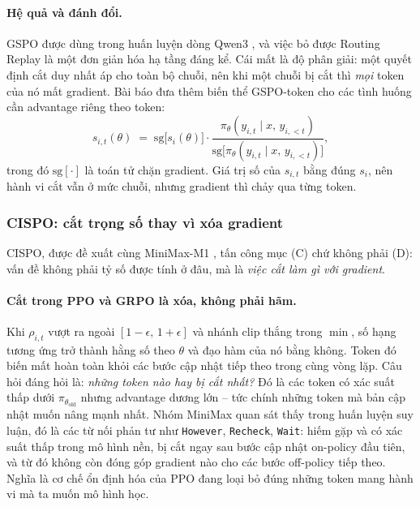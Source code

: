 \paragraph{Hệ quả và đánh đổi.}
GSPO được dùng trong huấn luyện dòng Qwen3 \cite{yang2025qwen3}, và việc bỏ được Routing Replay là một đơn giản hóa hạ tầng đáng kể. Cái mất là độ phân giải: một quyết định cắt duy nhất áp cho toàn bộ chuỗi, nên khi một chuỗi bị cắt thì \emph{mọi} token của nó mất gradient. Bài báo đưa thêm biến thể GSPO-token cho các tình huống cần advantage riêng theo token:
\[
s_{i,t}(\theta) \;=\; \mathrm{sg}\big[s_i(\theta)\big]\cdot\frac{\pi_\theta(y_{i,t}\mid x,\, y_{i,<t})}{\mathrm{sg}\big[\pi_\theta(y_{i,t}\mid x,\, y_{i,<t})\big]},
\]
trong đó $\mathrm{sg}[\cdot]$ là toán tử chặn gradient. Giá trị số của $s_{i,t}$ bằng đúng $s_i$, nên hành vi cắt vẫn ở mức chuỗi, nhưng gradient thì chảy qua từng token.

\subsubsection{CISPO: cắt trọng số thay vì xóa gradient}

CISPO, được đề xuất cùng MiniMax-M1 \cite{minimax2025m1}, tấn công mục (C) chứ không phải (D): vấn đề không phải tỷ số được tính ở đâu, mà là \emph{việc cắt làm gì với gradient}.

\paragraph{Cắt trong PPO và GRPO là xóa, không phải hãm.}
Khi $\rho_{i,t}$ vượt ra ngoài $[1-\epsilon,\, 1+\epsilon]$ và nhánh $\mathrm{clip}$ thắng trong $\min$, số hạng tương ứng trở thành hằng số theo $\theta$ và đạo hàm của nó bằng không. Token đó biến mất hoàn toàn khỏi các bước cập nhật tiếp theo trong cùng vòng lặp. Câu hỏi đáng hỏi là: \emph{những token nào hay bị cắt nhất?} Đó là các token có xác suất thấp dưới $\pi_{\theta_{\mathrm{old}}}$ nhưng advantage dương lớn -- tức chính những token mà bản cập nhật muốn nâng mạnh nhất. Nhóm MiniMax quan sát thấy trong huấn luyện suy luận, đó là các từ nối phản tư như \texttt{However}, \texttt{Recheck}, \texttt{Wait}: hiếm gặp và có xác suất thấp trong mô hình nền, bị cắt ngay sau bước cập nhật on-policy đầu tiên, và từ đó không còn đóng góp gradient nào cho các bước off-policy tiếp theo. Nghĩa là cơ chế ổn định hóa của PPO đang loại bỏ đúng những token mang hành vi mà ta muốn mô hình học.

